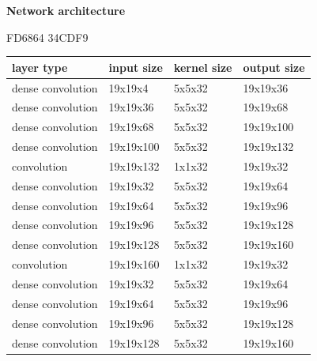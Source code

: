 \documentclass[xcolor=dvipsnames]{beamer}
\begin{document}
\begin{frame}{\bf Network architecture}

\scriptsize
{

FD6864
34CDF9
\begin{table}[]
\begin{tabular}{|l|l|l|l|}
\hline
\textbf{layer type}                       & \textbf{input size} & \textbf{kernel size} & \textbf{output size} \\ \hline
\cellcolor[HTML]{FD6864}dense convolution & 19x19x4             & 5x5x32               & 19x19x36             \\ \hline
\cellcolor[HTML]{FD6864}dense convolution & 19x19x36            & 5x5x32               & 19x19x68             \\ \hline
\cellcolor[HTML]{FD6864}dense convolution & 19x19x68            & 5x5x32               & 19x19x100            \\ \hline
\cellcolor[HTML]{FD6864}dense convolution & 19x19x100           & 5x5x32               & 19x19x132            \\ \hline
\cellcolor[HTML]{34CDF9}convolution       & 19x19x132           & 1x1x32               & 19x19x32             \\ \hline
\cellcolor[HTML]{FD6864}dense convolution & 19x19x32            & 5x5x32               & 19x19x64             \\ \hline
\cellcolor[HTML]{FD6864}dense convolution & 19x19x64            & 5x5x32               & 19x19x96             \\ \hline
\cellcolor[HTML]{FD6864}dense convolution & 19x19x96            & 5x5x32               & 19x19x128            \\ \hline
\cellcolor[HTML]{FD6864}dense convolution & 19x19x128           & 5x5x32               & 19x19x160            \\ \hline
\cellcolor[HTML]{34CDF9}convolution       & 19x19x160           & 1x1x32               & 19x19x32             \\ \hline
\cellcolor[HTML]{FD6864}dense convolution & 19x19x32            & 5x5x32               & 19x19x64             \\ \hline
\cellcolor[HTML]{FD6864}dense convolution & 19x19x64            & 5x5x32               & 19x19x96             \\ \hline
\cellcolor[HTML]{FD6864}dense convolution & 19x19x96            & 5x5x32               & 19x19x128            \\ \hline
\cellcolor[HTML]{FD6864}dense convolution & 19x19x128           & 5x5x32               & 19x19x160            \\ \hline

\end{tabular}
\end{table}}
\end{frame}
\end{document}
